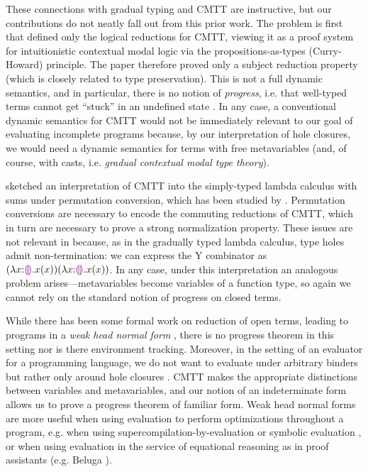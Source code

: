 %
These connections with gradual typing and CMTT are instructive, but our contributions do not neatly fall out from this prior work.
%
The problem is first that \citet{Nanevski2008} defined only the logical reductions for CMTT, viewing it as a proof system for intuitionistic contextual modal logic via the propositions-as-types (Curry-Howard) principle. 
The paper therefore proved only a subject reduction property (which is closely related to type preservation). 
This is not a full dynamic semantics, and in particular, there is no notion of \emph{progress}, i.e. that well-typed terms cannot get ``stuck'' in an undefined state \cite{wright94:_type_soundness}. 
In any case, a conventional dynamic semantics for CMTT would not be immediately relevant to our goal of evaluating incomplete programs because, by our interpretation of hole closures, we would need a dynamic semantics for terms with free metavariables (and, of course, with casts, i.e. \emph{gradual contextual modal type theory}).

\citet{Nanevski2008} sketched an interpretation of CMTT into the simply-typed lambda calculus with sums under permutation conversion, %
which has been studied by \citet{DBLP:journals/iandc/Groote02}. 
Permutation conversions are necessary to encode the commuting reductions of CMTT, which in turn are necessary to prove a strong normalization property. 
These issues are not relevant in \HazelnutLive because, as in the gradually typed lambda calculus, type holes admit non-termination: we can express the Y combinator as $(\lambda x{:}\textcolor{violet}{\llparenthesis}\textcolor{violet}{\rrparenthesis}.x(x)) (\lambda x{:}\textcolor{violet}{\llparenthesis}\textcolor{violet}{\rrparenthesis}.x(x))$.
In any case, under this interpretation an analogous problem arises---metavariables become variables of a function type, so again we cannot rely on the standard notion of progress on closed terms. 

While there has been some formal work on reduction of open terms, leading to programs in a \emph{weak head normal form} \cite{barendregt84:_lambda_calculus,DBLP:journals/corr/abs-1009-2789}, there is no progress theorem in this setting nor is there environment tracking. Moreover, in the setting of an evaluator for a programming language, we do not want to evaluate under arbitrary binders but rather only around hole closures \cite{DBLP:conf/birthday/BlancLM05}. CMTT makes the appropriate distinctions between variables and metavariables, and our notion of an indeterminate form allows us to prove a progress theorem of familiar form. Weak head normal forms are more useful when using evaluation to perform optimizations throughout a program, e.g. when using supercompilation-by-evaluation \cite{DBLP:conf/haskell/BolingbrokeJ10} or symbolic evaluation \cite{King:1976}, or when using evaluation in the service of equational reasoning as in proof assistants (e.g. Beluga \cite{DBLP:journals/corr/abs-1009-2789}).

